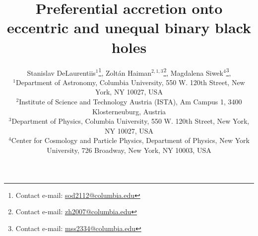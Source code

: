 \documentclass[fleqn,usenatbib]{mnras}
\begin{document}
\author[S. DeLaurentiis et al.]{
Stanislav DeLaurentiis$^{1}$\thanks{Contact e-mail: \href{mailto:sod2112@columbia.edu}{sod2112@columbia.edu}}, Zolt\'an Haiman$^{2,1,3}$\thanks{Contact e-mail: \href{mailto:zh2007@columbia.edu}{zh2007@columbia.edu}}, Magdalena Siwek$^{4}$\thanks{Contact e-mail: \href{mailto:mss2334@columbia.edu}{mss2334@columbia.edu}}, 
\\
$^{1}$Department of Astronomy, Columbia University, 550 W. 120th Street, New York, NY 10027, USA\\
$^{2}$Institute of Science and Technology Austria (ISTA), Am Campus 1, 3400 Klosterneuburg, Austria\\
$^{3}$Department of Physics, Columbia University, 550 W. 120th Street, New York, NY 10027, USA\\
$^{4}$Center for Cosmology and Particle Physics, Department of Physics, New York University, 726 Broadway, New York, NY 10003, USA\\
}

\title{Preferential accretion onto eccentric and unequal binary black holes}


\date{}


\label{firstpage}
\pagerange{\pageref{firstpage}--\pageref{lastpage}}
\maketitle
\end{document}
